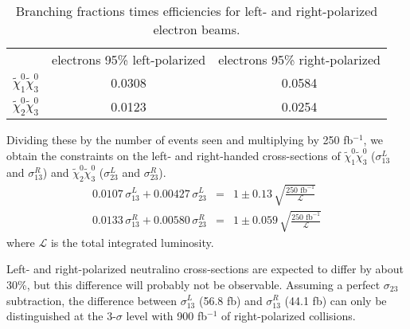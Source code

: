 \documentclass[12pt]{article}
\begin{document}
\begin{table}[!h]
  \begin{center}
    \renewcommand{\arraystretch}{1.5}
    \begin{tabular}{c c c}
      & electrons 95\% left-polarized & electrons 95\% right-polarized \\
      $\tilde{\chi}^0_1\tilde{\chi}^0_3$ & 0.0308 & 0.0584 \\
      $\tilde{\chi}^0_2\tilde{\chi}^0_3$ & 0.0123 & 0.0254
    \end{tabular}
    \renewcommand{\arraystretch}{1}
    \vspace{-0.5 cm}
  \end{center}

  \caption{Branching fractions times efficiencies for left- and
  right-polarized electron beams.  \label{jimpbetable}}

\end{table}

Dividing these by the number of events seen and multiplying by 250
fb$^{-1}$, we obtain the constraints on the left- and right-handed
cross-sections of $\tilde{\chi}^0_1\tilde{\chi}^0_3$ ($\sigma_{13}^L$
and $\sigma_{13}^R$) and $\tilde{\chi}^0_2\tilde{\chi}^0_3$
($\sigma_{23}^L$ and $\sigma_{23}^R$).
\begin{eqnarray}
  0.0107 \, \sigma_{13}^L + 0.00427 \, \sigma_{23}^L &=& 1 \pm 0.13 \, \sqrt{\frac{250 \mbox{ fb}^{-1}}{\mathcal{L}}} \\
  0.0133 \, \sigma_{13}^R + 0.00580 \, \sigma_{23}^R &=& 1 \pm 0.059 \, \sqrt{\frac{250 \mbox{ fb}^{-1}}{\mathcal{L}}}
\end{eqnarray}
where $\mathcal{L}$ is the total integrated luminosity.

Left- and right-polarized neutralino cross-sections are expected to
differ by about 30\%, but this difference will probably not be
observable.  Assuming a perfect $\sigma_{23}$ subtraction, the
difference between $\sigma_{13}^L$ (56.8 fb) and $\sigma_{13}^R$ (44.1
fb) can only be distinguished at the 3-$\sigma$ level with 900
fb$^{-1}$ of right-polarized collisions.
\end{document}
